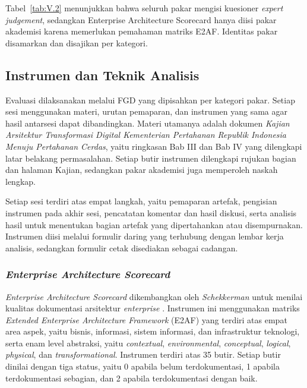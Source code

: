 Tabel~\ref{tab:V.2} menunjukkan bahwa seluruh pakar mengisi kuesioner \textit{expert judgement}, sedangkan Enterprise Architecture Scorecard hanya diisi pakar akademisi karena memerlukan pemahaman matriks E2AF. Identitas pakar disamarkan dan disajikan per kategori.

\subsection{Instrumen dan Teknik Analisis}
\label{sec:V.1.3}

Evaluasi dilaksanakan melalui FGD yang dipisahkan per kategori pakar. Setiap sesi menggunakan materi, urutan pemaparan, dan instrumen yang sama agar hasil antarsesi dapat dibandingkan. Materi utamanya adalah dokumen \textit{Kajian Arsitektur Transformasi Digital Kementerian Pertahanan Republik Indonesia Menuju Pertahanan Cerdas}, yaitu ringkasan Bab III dan Bab IV yang dilengkapi latar belakang permasalahan. Setiap butir instrumen dilengkapi rujukan bagian dan halaman Kajian, sedangkan pakar akademisi juga memperoleh naskah lengkap.

Setiap sesi terdiri atas empat langkah, yaitu pemaparan artefak, pengisian instrumen pada akhir sesi, pencatatan komentar dan hasil diskusi, serta analisis hasil untuk menentukan bagian artefak yang dipertahankan atau disempurnakan. Instrumen diisi melalui formulir daring yang terhubung dengan lembar kerja analisis, sedangkan formulir cetak disediakan sebagai cadangan.

\subsubsection{\textit{Enterprise Architecture Scorecard}}
\label{sec:V.1.3.1}

\textit{Enterprise Architecture Scorecard} dikembangkan oleh \textit{Schekkerman} untuk menilai kualitas dokumentasi arsitektur \textit{enterprise} \cite{Schekkerman2004,Schekkerman2006}. Instrumen ini menggunakan matriks \textit{Extended Enterprise Architecture Framework} (E2AF) yang terdiri atas empat area aspek, yaitu bisnis, informasi, sistem informasi, dan infrastruktur teknologi, serta enam level abstraksi, yaitu \textit{contextual}, \textit{environmental}, \textit{conceptual}, \textit{logical}, \textit{physical}, dan \textit{transformational}. Instrumen terdiri atas 35 butir. Setiap butir dinilai dengan tiga status, yaitu 0 apabila belum terdokumentasi, 1 apabila terdokumentasi sebagian, dan 2 apabila terdokumentasi dengan baik.

